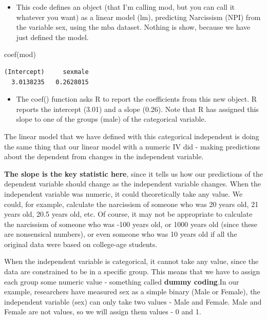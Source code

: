 \documentclass[
  letterpaper,
  DIV=11,
  numbers=noendperiod,
  oneside]{scrreprt}
\newenvironment{Shaded}{\begin{snugshade}}{\end{snugshade}}
\newcommand{\FunctionTok}[1]{\textcolor[rgb]{0.28,0.35,0.67}{#1}}
\newcommand{\NormalTok}[1]{\textcolor[rgb]{0.00,0.23,0.31}{#1}}
\providecommand{\tightlist}{%
  \setlength{\itemsep}{0pt}\setlength{\parskip}{0pt}}\usepackage{longtable,booktabs,array}
\begin{document}
\begin{itemize}
\tightlist
\item
  This code defines an object (that I'm calling mod, but you can call it
  whatever you want) as a linear model (lm), predicting Narcissism (NPI)
  from the variable sex, using the mba dataset. Nothing is show, because
  we have just defined the model.
\end{itemize}

\begin{Shaded}
\begin{Highlighting}[]
\FunctionTok{coef}\NormalTok{(mod)}
\end{Highlighting}
\end{Shaded}

\begin{verbatim}
(Intercept)     sexmale 
  3.0138235   0.2628015 
\end{verbatim}

\begin{itemize}
\tightlist
\item
  The coef() function asks R to report the coefficients from this new
  object. R reports the intercept (3.01) and a slope (0.26). Note that R
  has assigned this slope to one of the groups (male) of the categorical
  variable.
\end{itemize}

The linear model that we have defined with this categorical independent
is doing the same thing that our linear model with a numeric IV did -
making predictions about the dependent from changes in the independent
variable.~

\textbf{The slope is the key statistic here}, since it tells us how our
predictions of the dependent variable should change as the independent
variable changes. When the independent variable was numeric, it could
theoretically take any value. We could, for example, calculate the
narcissism of someone who was 20 years old, 21 years old, 20.5 years
old, etc. Of course, it may not be appropriate to calculate the
narcissism of someone who was -100 years old, or 1000 years old (since
these are nonsensical numbers), or even someone who was 10 years old if
all the original data were based on college-age students.~

When the independent variable is categorical, it cannot take any value,
since the data are constrained to be in a specific group. This means
that we have to assign each group some numeric value - something called
\textbf{dummy coding}.In our example, researchers have measured sex as a
simple binary (Male or Female), the independent variable (sex) can only
take two values - Male and Female. Male and Female are not values, so we
will assign them values - 0 and 1.
\end{document}
